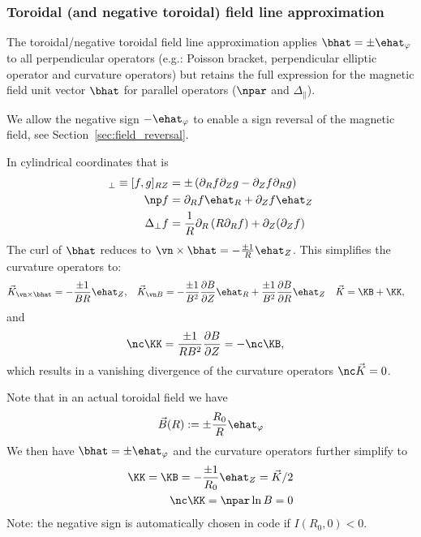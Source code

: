 \subsubsection{Toroidal (and negative toroidal) field line approximation}\label{sec:torfieldlineapprox}
The toroidal/negative toroidal field line approximation applies \(\bhat= \pm \ehat_\varphi\) to all perpendicular operators
(e.g.: Poisson bracket, perpendicular elliptic operator and curvature operators)
but retains the full expression for the magnetic field unit vector \(\bhat\)
for parallel operators (\(\npar\) and \(\Delta_\parallel\)).
\begin{tcolorbox}[title=Note]
We allow the negative sign $-\ehat_\varphi$ to enable a sign reversal of the magnetic field, see Section~\ref{sec:field_reversal}.
\end{tcolorbox}
In cylindrical coordinates that is
\begin{align}
[f,g]_\perp \equiv [f,g]_{RZ} &= \pm \left(\partial_R f\partial_Z g - \partial_Z f\partial_R g\right) \\
\np f &= \partial_R f \ehat_R + \partial_Z f \ehat_Z \\
\Delta_\perp f &= \frac{1}{R}\partial_R \left( R \partial_R f\right) + \partial_Z(\partial_Z f)
\label{}
\end{align}
The curl of $\bhat$ reduces to
 $\vn\times\bhat = -  \frac{\pm 1}{R} \ehat_Z$.
This simplifies the curvature operators to:
\begin{align}
\vec{{K}}_{{\vn\times\bhat}}  &=  -  \frac{\pm 1}{B R} \ehat_Z , &
\vec{ {K} }_{\vn  B}  &=  -\frac{\pm 1}{B^2}\frac{\partial B}{\partial Z}\ehat_R +\frac{\pm 1}{B^2} \frac{\partial B}{\partial R}\ehat_Z &
\vec{ {K} } &= \KB  +\KK ,
\end{align}
and
\begin{align}
    \nc \KK &= \frac{\pm 1}{R B^2} \frac{\partial B}{\partial Z} = -\nc \KB,
\end{align}
which results in a vanishing divergence of the curvature operators \( \nc \vec{ {K} } = 0\).

Note that in an actual toroidal field we have
\begin{align}
  \vec B(R) := \pm \frac{R_0}{R} \ehat_\varphi
  \label{}
\end{align}
We then have $\bhat = \pm\ehat_\varphi$ and the curvature operators further
simplify to
\begin{align}
  \KK = \KB = -\frac{\pm 1}{R_0} \ehat_Z =
\vec{  K}/2\\
  \nc\KK=
    \npar \ln B = 0
    \label{}
\end{align}
Note: the negative sign is automatically chosen in code if $I(R_0, 0)<0$.

